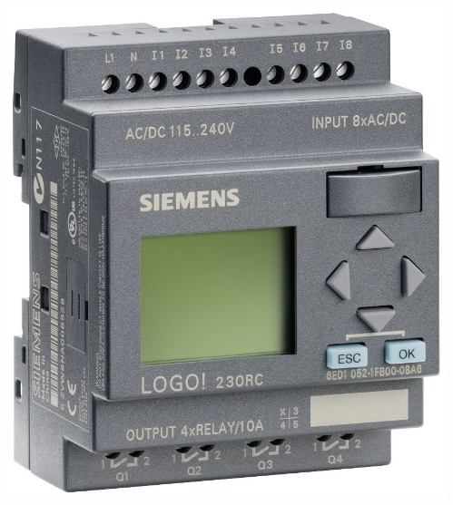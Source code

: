 \documentclass{beamer}
\begin{document}
\begin{frame}[fragile]{}
\begin{columns}[T]
\begin{column}{.495\textwidth}
\begin{tcolorbox}[adjusted title={\centering\large Industrial Systems}, equal height group=K]
\begin{columns}
\begin{column}{.3\textwidth}
{                            \includegraphics{plc}
                        }
                    \end{column}
                    \begin{column}{.3\textwidth}
                        \centering
                    \end{column}

\end{columns}
\end{tcolorbox}
\end{column}
\end{columns}
\end{frame}
\end{document}
